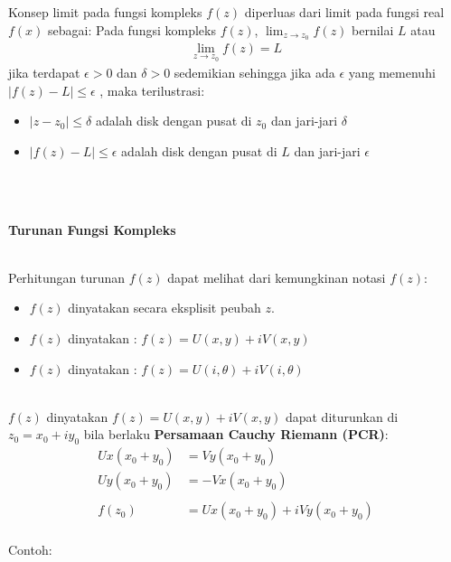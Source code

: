 \documentclass{article}
\begin{document}
Konsep limit pada fungsi kompleks $f(z)$ diperluas dari limit pada fungsi real $f(x)$ sebagai:
Pada fungsi kompleks $f(z)$, $\lim_{z \to z_0} f(z)$ bernilai $L$ atau
\begin{align}
    \lim_{z \to z_0} f(z) = L
\end{align}
jika terdapat $\epsilon  > 0$ dan $\delta  > 0$ sedemikian sehingga jika ada $\epsilon$ yang memenuhi $|f(z) - L| \leq \epsilon$ , maka terilustrasi:
\begin{itemize}
    \item $|z - z_0| \leq \delta$ adalah disk dengan pusat di $z_0$ dan jari-jari $\delta$
    \item $|f(z) - L| \leq \epsilon$ adalah disk dengan pusat di $L$ dan jari-jari $\epsilon$
\end{itemize}
\leavevmode\\ \\

\begin{center}
    \textbf{Turunan Fungsi Kompleks}
\end{center}
\leavevmode\\

Perhitungan turunan $f(z)$ dapat melihat dari kemungkinan notasi $f(z)$:
\begin{itemize}
    \item $f(z)$ dinyatakan secara eksplisit peubah $z$.
    \item $f(z)$ dinyatakan : $f(z) = U(x,y) + iV(x,y)$
    \item $f(z)$ dinyatakan : $f(z) = U(i,\theta)+ iV(i,\theta)$
\end{itemize}
\leavevmode\\

$f(z)$ dinyatakan $f(z) = U(x,y) + iV(x,y)$ dapat diturunkan di $z_0 = x_0 + iy_0$ bila berlaku \textbf{Persamaan Cauchy Riemann (PCR)}:\\
\begin{align}
    Ux (x_0 + y_0) & = Vy (x_0 + y_0)
    \nonumber                                            \\
    Uy (x_0 + y_0) & = -Vx (x_0 + y_0)
    \nonumber                                            \\
    \nonumber                                            \\
    f(z_0)         & = Ux (x_0 + y_0) + i Vy (x_0 + y_0)
\end{align}
\leavevmode\\

\newpage
Contoh:
\end{document}
